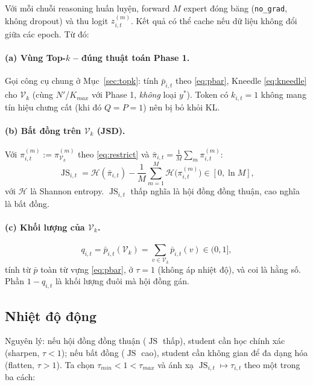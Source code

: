 \documentclass[12pt,a4paper]{article}
\theoremstyle{plain}
\DeclareMathOperator{\JS}{JS}
\newcommand{\Vk}{\mathcal V_k}
\newcommand{\ytar}{y^{*}}
\begin{document}
Với mỗi chuỗi reasoning huấn luyện, forward $M$ expert đóng băng (\texttt{no\_grad}, không dropout) và thu logit $z^{(m)}_{i,t}$. Kết quả có thể cache nếu dữ liệu không đổi giữa các epoch. Từ đó:

\paragraph{(a) Vùng Top-$k$ -- đúng thuật toán Phase 1.}
Gọi công cụ chung ở Mục~\ref{sec:topk}: tính $\bar p_{i,t}$ theo \eqref{eq:pbar}, Kneedle \eqref{eq:kneedle} cho $\Vk$ (cùng $N'$/$K_{max}$ với Phase 1, \emph{không} loại $\ytar$). Token có $k_{i,t}=1$ không mang tín hiệu chưng cất (khi đó $Q=P=1$) nên bị bỏ khỏi KL.

\paragraph{(b) Bất đồng trên $\Vk$ (JSD).}
Với $\pi^{(m)}_{i,t}:=\pi^{(m)}_{\Vk}$ theo \eqref{eq:restrict} và $\bar\pi_{i,t}=\frac1M\sum_m\pi^{(m)}_{i,t}$:
\begin{equation}
\label{eq:jsd}
\JS_{i,t}=\mathcal H(\bar\pi_{i,t})-\frac1M\sum_{m=1}^M\mathcal H\big(\pi^{(m)}_{i,t}\big)\in[0,\ln M],
\end{equation}
với $\mathcal H$ là Shannon entropy. $\JS_{i,t}$ thấp nghĩa là hội đồng đồng thuận, cao nghĩa là bất đồng.

\paragraph{(c) Khối lượng của $\Vk$.}
\begin{equation}
\label{eq:qmass}
q_{i,t}=\bar p_{i,t}(\Vk)=\sum_{v\in\Vk}\bar p_{i,t}(v)\in(0,1],
\end{equation}
tính từ $\bar p$ toàn từ vựng \eqref{eq:pbar}, ở $\tau=1$ (không áp nhiệt độ), và coi là hằng số. Phần $1-q_{i,t}$ là khối lượng đuôi mà hội đồng gán.

\subsection{Nhiệt độ động}
\label{sec:temp}

Nguyên lý: nếu hội đồng đồng thuận ($\JS$ thấp), student cần học chính xác (sharpen, $\tau<1$); nếu bất đồng ($\JS$ cao), student cần không gian để đa dạng hóa (flatten, $\tau>1$). Ta chọn $\tau_{min}<1<\tau_{max}$ và ánh xạ $\JS_{i,t}\mapsto\tau_{i,t}$ theo một trong ba cách:
\end{document}
